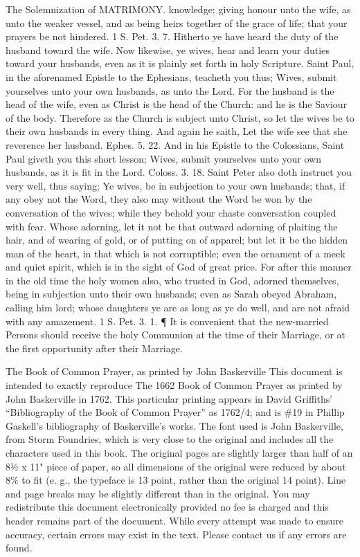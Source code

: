 The Solemnization of MATRIMONY. knowledge; giving honour unto the wife, as unto the weaker vessel, and as being heirs together of the grace of life; that your prayers be not hindered. 1 S. Pet. 3. 7. Hitherto ye have heard the duty of the husband toward the wife. Now likewise, ye wives, hear and learn your duties toward your husbands, even as it is plainly set forth in holy Scripture. Saint Paul, in the aforenamed Epistle to the Ephesians, teacheth you thus; Wives, submit yourselves unto your own husbands, as unto the Lord. For the husband is the head of the wife, even as Christ is the head of the Church: and he is the Saviour of the body. Therefore as the Church is subject unto Christ, so let the wives be to their own husbands in every thing. And again he saith, Let the wife see that she reverence her husband. Ephes. 5. 22. And in his Epistle to the Colossians, Saint Paul giveth you this short lesson; Wives, submit yourselves unto your own husbands, as it is fit in the Lord. Coloss. 3. 18. Saint Peter also doth instruct you very well, thus saying; Ye wives, be in subjection to your own husbands; that, if any obey not the Word, they also may without the Word be won by the conversation of the wives; while they behold your chaste conversation coupled with fear. Whose adorning, let it not be that outward adorning of plaiting the hair, and of wearing of gold, or of putting on of apparel; but let it be the hidden man of the heart, in that which is not corruptible; even the ornament of a meek and quiet spirit, which is in the sight of God of great price. For after this manner in the old time the holy women also, who trusted in God, adorned themselves, being in subjection unto their own husbands; even as Sarah obeyed Abraham, calling him lord; whose daughters ye are as long as ye do well, and are not afraid with any amazement. 1 S. Pet. 3. 1. ¶ It is convenient that the new-married Persons should receive the holy Communion at the time of their Marriage, or at the first opportunity after their Marriage.


The Book of Common Prayer, as printed by John Baskerville This document is intended to exactly reproduce The 1662 Book of Common Prayer as printed by John Baskerville in 1762. This particular printing appears in David Griffiths' “Bibliography of the Book of Common Prayer” as 1762/4; and is \#19 in Phillip Gaskell's bibliography of Baskerville's works. The font used is John Baskerville, from Storm Foundries, which is very close to the original and includes all the characters used in this book. The original pages are slightly larger than half of an 8½ x 11" piece of paper, so all dimensions of the original were reduced by about 8\% to fit (e. g., the typeface is 13 point, rather than the original 14 point). Line and page breaks may be slightly different than in the original. You may redistribute this document electronically provided no fee is charged and this header remains part of the document. While every attempt was made to ensure accuracy, certain errors may exist in the text. Please contact us if any errors are found.

